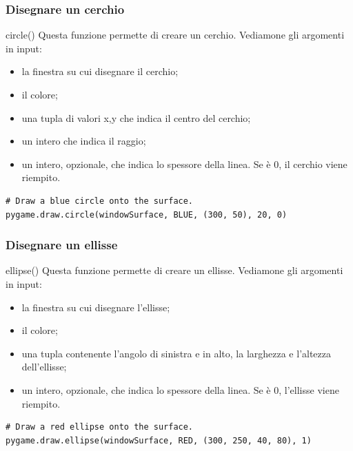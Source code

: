 \documentclass{beamer}
\begin{document}
\begin{frame}[fragile]
\frametitle{Disegnare un cerchio}
\begin{block}{circle()}
	Questa funzione permette di creare un cerchio. Vediamone gli argomenti in input:
	\begin{itemize}
		\item la finestra su cui disegnare il cerchio;
		\item il colore;
		\item una tupla di valori x,y che indica il centro del cerchio;
		\item un intero che indica il raggio;
		\item un intero, opzionale, che indica lo spessore della linea. Se è 0, il cerchio viene riempito.
	\end{itemize}
\end{block}
\begin{lstlisting}
# Draw a blue circle onto the surface.
pygame.draw.circle(windowSurface, BLUE, (300, 50), 20, 0)

\end{lstlisting}
\end{frame}

\begin{frame}[fragile]
\frametitle{Disegnare un ellisse}
\begin{block}{ellipse()}
	Questa funzione permette di creare un ellisse. Vediamone gli argomenti in input:
	\begin{itemize}
		\item la finestra su cui disegnare l'ellisse;
		\item il colore;
		\item una tupla contenente l'angolo di sinistra e in alto, la larghezza e l'altezza dell'ellisse;
		\item un intero, opzionale, che indica lo spessore della linea. Se è 0, l'ellisse viene riempito.
	\end{itemize}
\end{block}
\begin{lstlisting}
# Draw a red ellipse onto the surface.
pygame.draw.ellipse(windowSurface, RED, (300, 250, 40, 80), 1)

\end{lstlisting}
\end{frame}
\end{document}

